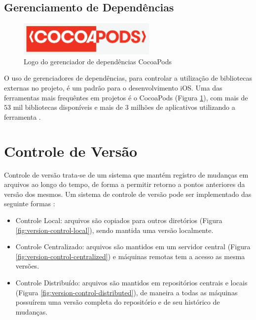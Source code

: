 \subsection{Gerenciamento de Dependências}
\begin{figure}[h]
    \centering
    \includegraphics[width=0.6\textwidth]{pfc/figuras/cocoapods.png}
    \caption{Logo do gerenciador de dependências CocoaPods}
    \label{fig:cocoapods}
\end{figure}
O uso de gerenciadores de dependências, para controlar a utilização de bibliotecas externas no projeto, é um padrão para o desenvolvimento iOS. Uma das ferramentas mais frequêntes em projetos é o CocoaPods (Figura \ref{fig:cocoapods}), com mais de $53$ mil bibliotecas disponíveis e mais de $3$ milhões de aplicativos utilizando a ferramenta .

\section{Controle de Versão}
Controle de versão trata-se de um sistema que mantém registro de mudanças em arquivos ao longo do tempo, de forma a permitir retorno a pontos anteriores da versão dos mesmos. Um sistema de controle de versão pode ser implementado das seguinte formas :

\begin{itemize}
    \item Controle Local: arquivos são copiados para outros diretórios (Figura \ref{fig:version-control-local}), sendo mantida uma versão localmente.
    \item Controle Centralizado: arquivos são mantidos em um servidor central (Figura \ref{fig:version-control-centralized}) e máquinas remotas tem a acesso as mesma versões.
    \item Controle Distribuído: arquivos são mantidos em repositórios centrais e locais (Figura \ref{fig:version-control-distributed}), de maneira a todas as máquinas possuírem uma versão completa do repositório e de seu histórico de mudanças.
\end{itemize}

